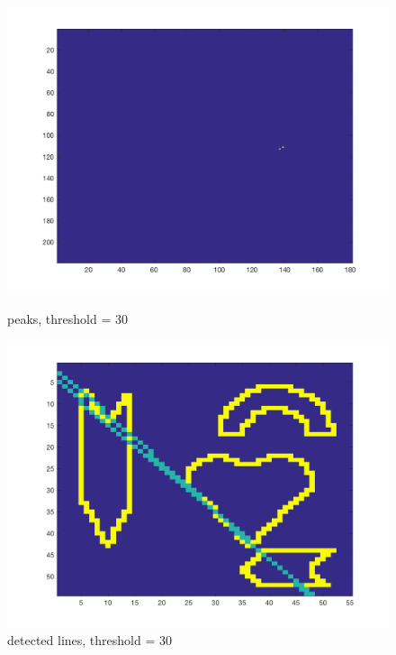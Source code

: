 \documentclass[paper=a4, fontsize=11pt]{scrartcl} %
\numberwithin{equation}{section} %
\numberwithin{figure}{section} %
\numberwithin{table}{section} %
\begin{document}
\begin{figure}[H]
  \centering
  \begin{minipage}[b]{0.49\textwidth}
    \includegraphics[width=\textwidth]{peaks_threshold_30.png}
    \caption{peaks, threshold = 30}
  \end{minipage}
  \hfill
  \begin{minipage}[b]{0.49\textwidth}
    \includegraphics[width=\textwidth]{edgeDetection_threshold_30.png}
    \caption{detected lines, threshold = 30}
  \end{minipage}
\end{figure}
\end{document}

